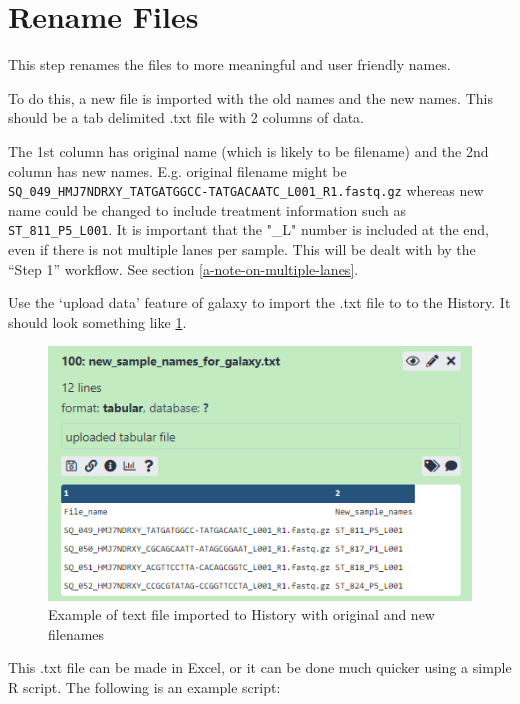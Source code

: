 \documentclass[
]{book}
\begin{document}
\hypertarget{rename-files}{%
\section{Rename Files}\label{rename-files}}

This step renames the files to more meaningful and user friendly names.

To do this, a new file is imported with the old names and the new names. This should be a tab delimited .txt file with 2 columns of data.

The 1st column has original name (which is likely to be filename) and the 2nd column has new names. E.g. original filename might be \texttt{SQ\_049\_HMJ7NDRXY\_TATGATGGCC-TATGACAATC\_L001\_R1.fastq.gz} whereas new name could be changed to include treatment information such as \texttt{ST\_811\_P5\_L001}.
It is important that the "\_L" number is included at the end, even if there is not multiple lanes per sample. This will be dealt with by the ``Step 1'' workflow. See section \ref{a-note-on-multiple-lanes}.

Use the `upload data' feature of galaxy to import the .txt file to to the History. It should look something like \ref{fig:example-rename}.

\begin{figure}

{\centering \includegraphics[width=1\linewidth]{images/image009} 

}

\caption{Example of text file imported to History with original and new filenames}\label{fig:example-rename}
\end{figure}

This .txt file can be made in Excel, or it can be done much quicker using a simple R script. The following is an example script:
\end{document}
